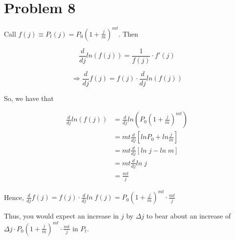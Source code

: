 \documentclass[12pt]{article}
\begin{document}
\section*{Problem 8}
Call $f(j) \equiv P_t(j) = P_0(1+\frac{j}{m})^{mt}$. Then 

\newcommand{\dv}[1]{\frac{d}{d#1}}

$$\dv j ln(f(j))=\frac{1}{f(j)}\cdot f'(j)$$

$$\Rightarrow \dv j f(j) = f(j)\cdot \dv{j}ln(f(j))$$

So, we have that

\begin{align}
\dv j ln(f(j)) &= \dv j ln(P_0(1+\frac{j}{m})^{mt}) \\
	&= mt \dv j [ln P_0 + ln\frac{j}{m}] \\
	&= mt\dv j[ln\; j - ln\; m]\\
	&= mt\dv j ln\; j\\
	&= \frac{mt}{j}
\end{align}

Hence, $\dv j f(j) = f(j)\cdot \dv j ln\; f(j) = P_0(1+\frac{j}{m})^{mt}\cdot \frac{mt}{j}$

Thus, you would expect an increase in $j$ by $\Delta j$ to
bear about an increase of $\Delta j\cdot P_0(1+\frac{j}{m})^{mt}\cdot \frac{mt}{j}$ in $P_t$.
\end{document}
